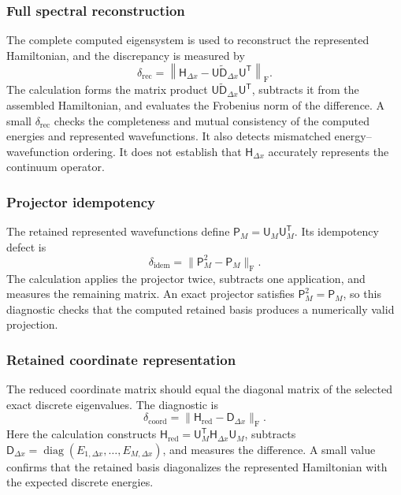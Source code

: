 \documentclass[11pt]{article}
\newcommand{\fro}{\mathrm{F}}
\newcommand{\mat}[1]{\mathsf{#1}}
\begin{document}
\subsubsection{Full spectral reconstruction}

The complete computed eigensystem is used to reconstruct the represented Hamiltonian,
and the discrepancy is measured by
\begin{equation}
 \delta_{\mathrm{rec}}
 =\left\lVert\mat{H}_{\Delta x}
 -\mat{U}\widetilde{\mat{D}}_{\Delta x}\mat{U}^{\mathsf T}\right\rVert_{\fro}.
 \label{eq:spectral-reconstruction-diagnostic}
\end{equation}
The calculation forms the matrix product
$\mat{U}\widetilde{\mat{D}}_{\Delta x}\mat{U}^{\mathsf T}$, subtracts it from the
assembled Hamiltonian, and evaluates the Frobenius norm of the difference. A small
$\delta_{\mathrm{rec}}$ checks the completeness and mutual consistency of the computed
energies and represented wavefunctions. It also detects mismatched
energy--wavefunction ordering. It does not establish that $\mat{H}_{\Delta x}$ accurately represents the
continuum operator.

\subsubsection{Projector idempotency}

The retained represented wavefunctions define
$\mat{P}_M=\mat{U}_M\mat{U}_M^{\mathsf T}$. Its
idempotency defect is
\begin{equation}
 \delta_{\mathrm{idem}}
 =\lVert\mat{P}_M^2-\mat{P}_M\rVert_{\fro}.
 \label{eq:projector-idempotency-diagnostic}
\end{equation}
The calculation applies the projector twice, subtracts one application, and measures
the remaining matrix. An exact projector satisfies $\mat{P}_M^2=\mat{P}_M$, so this
diagnostic checks that the computed retained basis produces a numerically valid
projection.

\subsubsection{Retained coordinate representation}

The reduced coordinate matrix should equal the diagonal matrix of the selected exact
discrete eigenvalues. The diagnostic is
\begin{equation}
 \delta_{\mathrm{coord}}
 =\lVert\mat{H}_{\mathrm{red}}-\mat{D}_{\Delta x}\rVert_{\fro}.
 \label{eq:retained-coordinate-diagnostic}
\end{equation}
Here the calculation constructs
$\mat{H}_{\mathrm{red}}=\mat{U}_M^{\mathsf T}
\mat{H}_{\Delta x}\mat{U}_M$, subtracts
$\mat{D}_{\Delta x}=\operatorname{diag}(E_{1,\Delta x},\ldots,
E_{M,\Delta x})$, and measures the difference. A small value confirms that the
retained basis diagonalizes the represented Hamiltonian with the expected discrete
energies.
\end{document}
